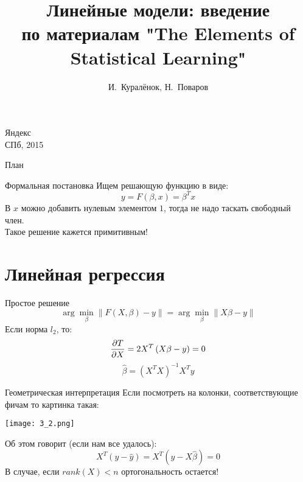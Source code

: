 \documentclass[14pt, fleqn, xcolor={dvipsnames, table}]{beamer}
\title{Линейные модели: введение\\\small{по материалам "The Elements of Statistical Learning"}}
\author[]{\small{%
И.~Куралёнок,
Н.~Поваров}}
\date{}
\begin{document}
\begin{frame}
\maketitle
\small
\begin{center}
\vspace{-60pt}
\normalsize {\color{red}Я}ндекс \\
\vspace{80pt}
\footnotesize СПб, 2015
\end{center}
\end{frame}


\begin{frame}{План}
\tableofcontents
\end{frame}

\begin{frame}{Формальная постановка}
Ищем решающую функцию в виде:
$$
y = F(\beta, x) = \beta^T x
$$
В $x$ можно добавить нулевым элементом $1$, тогда не надо таскать свободный член. \\
Такое решение кажется примитивным! \\
\end{frame}

\section{Линейная регрессия}
\begin{frame}{Простое решение}
$$
\arg \min_{\beta} \|F(X, \beta) - y\| = \arg \min_{\beta} \|X \beta - y\|
$$
Если норма $l_2$, то:
$$
{\partial T \over \partial X} = 2 X^T\left(X\beta - y\right) = 0
$$
$$
\hat{\beta} = (X^TX)^{-1}X^Ty
$$
\end{frame}

\begin{frame}{Геометрическая интерпретация}
\small
Если посмотреть на колонки, соответствующие фичам то картинка такая:
\begin{center}
\texttt{[image: 3\_2.png]}
\end{center}
Об этом говорит (если нам все удалось):
$$
X^T(y - \hat{y}) = X^T(y - X\hat{\beta}) = 0
$$
В случае, если $rank(X) < n$ ортогональность остается!
\end{frame}
\end{document}
